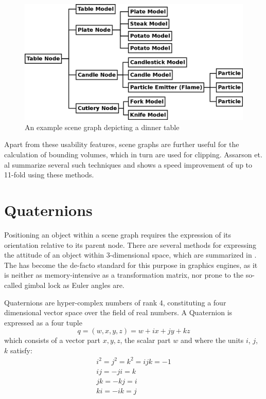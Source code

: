 	\begin{figure}[htbp]
		\centering
		\includegraphics[width=14cm]{images/example-scenegraph.png}
		\caption{An example scene graph depicting a dinner table}
		\label{fig:ExampleSceneGraph}
	\end{figure}

	Apart from these usability features, scene graphs are further useful for the calculation of bounding volumes, which in turn are used for clipping. Assarson et. al summarize several such techniques and shows a speed improvement of up to 11-fold using these methods\cite{Assarsson:2000:OVF:360529.360537}.

\section{Quaternions}

	Positioning an object within a scene graph requires the expression of its orientation relative to its parent node. There are several methods for expressing the attitude of an object within 3-dimensional space, which are summarized in \cite{Diebel06}. The  has become the de-facto standard for this purpose in graphics engines\cite{Mukundan02}, as it is neither as memory-intensive as a transformation matrix, nor prone to the so-called gimbal lock as Euler angles are.

	Quaternions are hyper-complex numbers of rank 4, constituting a four dimensional vector space over the field of real numbers\cite{birkhoff1960survey}. A Quaternion is expressed as a four tuple
	\[q = (w, x, y, z) = w + ix + jy + kz\]
	which consists of a vector part $x, y, z$, the scalar part $w$ and where the units $i$, $j$, $k$ satisfy:
	\begin{gather}
		i^{2} = j^{2} = k^{2} = ijk = -1 \\
		ij = -ji = k \\
		jk = -kj = i \\
		ki = -ik = j
	\end{gather}

